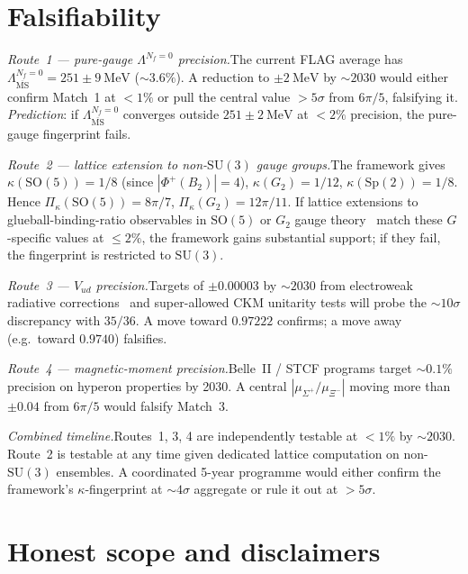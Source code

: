 \documentclass[aps,prl,reprint,amsmath,amssymb,nofootinbib,floatfix,superscriptaddress]{revtex4-2}
\newcommand{\SU}{\mathrm{SU}}
\newcommand{\SO}{\mathrm{SO}}
\newcommand{\msbar}{\overline{\mathrm{MS}}}
\newcommand{\Piskappa}{\Pi_{\kappa}}
\newcommand{\Phiroots}{\Phi^{+}}
\newcommand{\LambdaPG}{\Lambda^{N_f = 0}_{\msbar}}
\begin{document}
\section{Falsifiability}
\label{sec:falsif}

\textit{Route~1 --- pure-gauge $\Lambda^{N_f=0}$ precision.}\quad The current FLAG average has $\LambdaPG = 251 \pm 9~\mathrm{MeV}$ (${\sim}3.6\%$). A reduction to $\pm 2~\mathrm{MeV}$ by $\sim 2030$ would either confirm Match~1 at $< 1\%$ or pull the central value $> 5\sigma$ from $6\pi/5$, falsifying it. \emph{Prediction}: if $\LambdaPG$ converges outside $251 \pm 2~\mathrm{MeV}$ at $< 2\%$ precision, the pure-gauge fingerprint fails.

\textit{Route~2 --- lattice extension to non-$\SU(3)$ gauge groups.}\quad The framework gives $\kappa(\SO(5)) = 1/8$ (since $|\Phiroots(B_2)| = 4$), $\kappa(G_2) = 1/12$, $\kappa(\mathrm{Sp}(2)) = 1/8$. Hence $\Piskappa(\SO(5)) = 8\pi/7$, $\Piskappa(G_2) = 12\pi/11$. If lattice extensions to glueball-binding-ratio observables in $\SO(5)$ or $G_2$ gauge theory~\cite{AthenodorouTeper2021} match these $G$-specific values at $\le 2\%$, the framework gains substantial support; if they fail, the fingerprint is restricted to $\SU(3)$.

\textit{Route~3 --- $V_{ud}$ precision.}\quad Targets of $\pm 0.00003$ by $\sim 2030$ from electroweak radiative corrections~\cite{SengGorchtein2018} and super-allowed CKM unitarity tests will probe the $\sim 10\sigma$ discrepancy with $35/36$. A move toward $0.97222$ confirms; a move away (e.g.\ toward $0.9740$) falsifies.

\textit{Route~4 --- magnetic-moment precision.}\quad Belle~II / STCF programs target ${\sim}0.1\%$ precision on hyperon properties by 2030. A central $|\mu_{\Sigma^+}/\mu_{\Xi^-}|$ moving more than $\pm 0.04$ from $6\pi/5$ would falsify Match~3.

\textit{Combined timeline.}\quad Routes~1, 3, 4 are independently testable at $< 1\%$ by $\sim 2030$. Route~2 is testable at any time given dedicated lattice computation on non-$\SU(3)$ ensembles. A coordinated 5-year programme would either confirm the framework's $\kappa$-fingerprint at ${\sim}4\sigma$ aggregate or rule it out at $> 5\sigma$.

\section{Honest scope and disclaimers}
\label{sec:scope}
\end{document}
